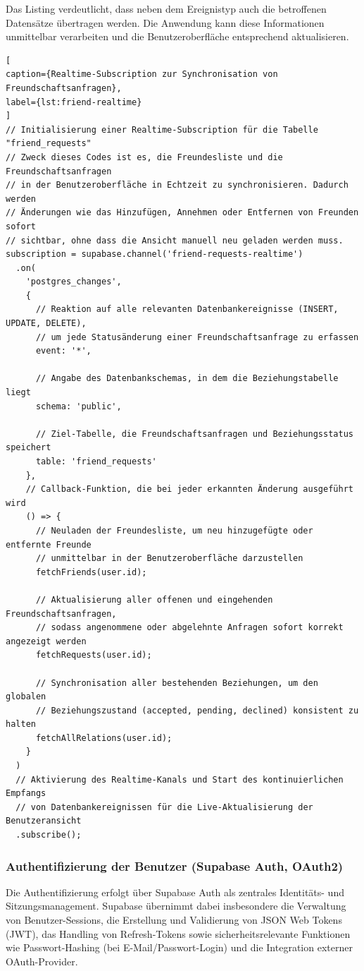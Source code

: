 Das Listing verdeutlicht, dass neben dem Ereignistyp auch die betroffenen Datensätze übertragen werden. 
Die Anwendung kann diese Informationen unmittelbar verarbeiten und die Benutzeroberfläche entsprechend aktualisieren.

\begin{lstlisting}[
caption={Realtime-Subscription zur Synchronisation von Freundschaftsanfragen},
label={lst:friend-realtime}
]
// Initialisierung einer Realtime-Subscription für die Tabelle "friend_requests"
// Zweck dieses Codes ist es, die Freundesliste und die Freundschaftsanfragen
// in der Benutzeroberfläche in Echtzeit zu synchronisieren. Dadurch werden
// Änderungen wie das Hinzufügen, Annehmen oder Entfernen von Freunden sofort
// sichtbar, ohne dass die Ansicht manuell neu geladen werden muss.
subscription = supabase.channel('friend-requests-realtime')
  .on(
    'postgres_changes',
    {
      // Reaktion auf alle relevanten Datenbankereignisse (INSERT, UPDATE, DELETE),
      // um jede Statusänderung einer Freundschaftsanfrage zu erfassen
      event: '*',

      // Angabe des Datenbankschemas, in dem die Beziehungstabelle liegt
      schema: 'public',

      // Ziel-Tabelle, die Freundschaftsanfragen und Beziehungsstatus speichert
      table: 'friend_requests'
    },
    // Callback-Funktion, die bei jeder erkannten Änderung ausgeführt wird
    () => {
      // Neuladen der Freundesliste, um neu hinzugefügte oder entfernte Freunde
      // unmittelbar in der Benutzeroberfläche darzustellen
      fetchFriends(user.id);

      // Aktualisierung aller offenen und eingehenden Freundschaftsanfragen,
      // sodass angenommene oder abgelehnte Anfragen sofort korrekt angezeigt werden
      fetchRequests(user.id);

      // Synchronisation aller bestehenden Beziehungen, um den globalen
      // Beziehungszustand (accepted, pending, declined) konsistent zu halten
      fetchAllRelations(user.id);
    }
  )
  // Aktivierung des Realtime-Kanals und Start des kontinuierlichen Empfangs
  // von Datenbankereignissen für die Live-Aktualisierung der Benutzeransicht
  .subscribe();
\end{lstlisting}

\subsubsection{Authentifizierung der Benutzer (Supabase Auth, OAuth2)}
Die Authentifizierung erfolgt über Supabase Auth als zentrales Identitäts- und Sitzungsmanagement. 
Supabase übernimmt dabei insbesondere die Verwaltung von Benutzer-Sessions, die Erstellung und Validierung von JSON Web Tokens (JWT), das Handling von Refresh-Tokens sowie sicherheitsrelevante Funktionen wie Passwort-Hashing (bei E-Mail/Passwort-Login) und die Integration externer OAuth-Provider.

